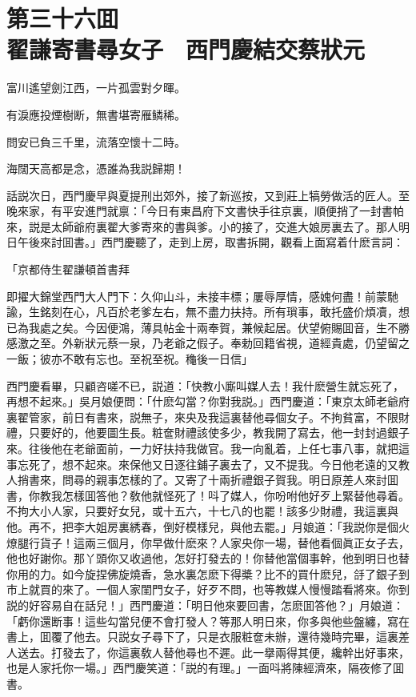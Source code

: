 
\chapter*{第三十六囬　\\翟謙寄書尋女子　西門慶結交蔡狀元}


\begin{myquote}
富川遙望劍江西，一片孤雲對夕暉。

有淚應投煙樹断，無書堪寄雁鳞稀。

問安已負三千里，流落空懷十二時。

海闊天高都是念，憑誰為我説歸期！
\end{myquote}

話説次日，西門慶早與夏提刑出郊外，接了新巡按，又到莊上犒勞做活的匠人。至晚來家，有平安進門就禀：「今日有東昌府下文書快手往京裏，順便捎了一封書帕來，説是太師爺府裏翟大爹寄來的書與爹。小的接了，交進大娘房裏去了。那人明日午後來討囬書。」西門慶聽了，走到上房，取書拆開，觀看上面寫着什麽言詞：

\begin{myquote}[\markfont]
\hspace*{4em}「京都侍生翟謙頓首書拜

即擢大錦堂西門大人門下：久仰山斗，未接丰標；屢辱厚情，感媿何盡！前蒙馳諭，生銘刻在心，凡百於老爹左右，無不盡力扶持。所有瑣事，敢托盛价煩凟，想已為我處之矣。今因便鴻，薄具帖金十兩奉賀，兼候起居。伏望俯賜囬音，生不勝感激之至。外新狀元蔡一泉，乃老爺之假子。奉勅回籍省視，道經貴處，仍望留之一飯；彼亦不敢有忘也。至祝至祝。龝後一日信」
\end{myquote}

西門慶看畢，只顧咨嗟不已，説道：「快教小廝叫媒人去！我什麽營生就忘死了，再想不起來。」吳月娘便問：「什麽勾當？你對我説。」西門慶道：「東京太師老爺府裏翟管家，前日有書來，説無子，來央及我這裏替他尋個女子。不拘貧富，不限財禮，只要好的，他要圖生長。粧奩財禮該使多少，教我開了寫去，他一封封過銀子來。往後他在老爺面前，一力好扶持我做官。我一向亂着，上任七事八事，就把這事忘死了，想不起來。來保他又日逐往鋪子裏去了，又不提我。今日他老遠的又教人捎書來，問尋的親事怎樣的了。又寄了十兩折禮銀子賀我。明日原差人來討囬書，你教我怎樣囬答他？敎他就怪死了！呌了媒人，你吩咐他好歹上緊替他尋着。不拘大小人家，只要好女兒，或十五六，十七八的也罷！該多少財禮，我這裏與他。再不，把李大姐房裏綉春，倒好模樣兒，與他去罷。」月娘道：「我説你是個火燎腿行貨子！這兩三個月，你早做什麽來？人家央你一場，替他看個眞正女子去，他也好謝你。那丫頭你又收過他，怎好打發去的！你替他當個事幹，他到明日也替你用的力。如今旋捏佛旋燒香，急水裏怎麽下得槳？比不的買什麽兒，㧱了銀子到市上就買的來了。一個人家閨門女子，好歹不問，也等教媒人慢慢踏看將來。你到説的好容易自在話兒！」西門慶道：「明日他來要回書，怎麽囬答他？」月娘道：「虧你還断事！這些勾當兒便不會打發人？等那人明日來，你多與他些盤纏，寫在書上，囬覆了他去。只説女子尋下了，只是衣服粧奩未辦，還待幾時完畢，這裏差人送去。打發去了，你這裏敎人替他尋也不遲。此一擧兩得其便，纔幹出好事來，也是人家托你一場。」西門慶笑道：「説的有理。」一面呌將陳經濟來，隔夜修了囬書。

